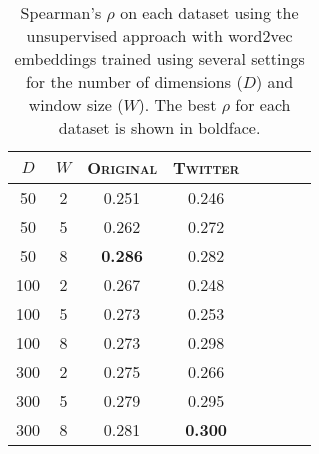 \documentclass[11pt]{article}
\newcommand\original{\textsc{Original}\xspace}
\newcommand\twitter{\textsc{Twitter}\xspace}
\newcommand{\tabref}[1]{Table~\ref{#1}}
\begin{document}



\begin{table}
\begin{center}
\small
\begin{tabular}{cc|ccc|ccc}
$D$ & $W$ & \textsc{Original} & \textsc{Twitter} \\
\hline
50 & 2  & 0.251 & 0.246 \\
50 & 5  & 0.262 & 0.272 \\
50 & 8  & \textbf{0.286} & 0.282 \\
\hline
100 & 2 & 0.267 & 0.248 \\
100 & 5 & 0.273 & 0.253 \\
100 & 8 & 0.273 & 0.298 \\
\hline
300 & 2 & 0.275 & 0.266 \\
300 & 5 & 0.279   & 0.295 \\
300 & 8 & 0.281 & \textbf{0.300} \\
\hline
\end{tabular}
\caption{Spearman's $\rho$ on each dataset using the unsupervised
  approach with word2vec embeddings trained using several settings for
  the number of dimensions ($D$) and window size ($W$). The best
  $\rho$ for each dataset is shown in boldface.\label{tbl:w2vresults}}
\end{center}
\end{table}



\end{document}
